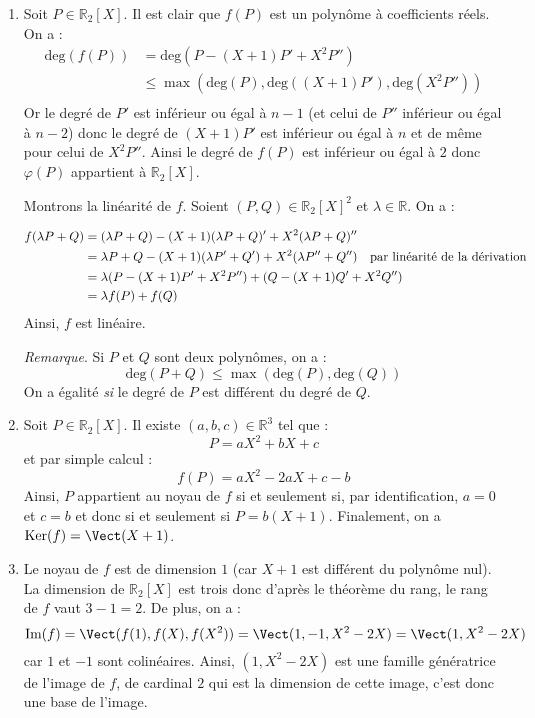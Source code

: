 \documentclass[a4paper,twoside,french,11pt]{VcCours}
\begin{document}
\begin{enumerate}
\item Soit $P \in \mathbb{R}_2[X]$. Il est clair que $f(P)$ est un polynôme à coefficients réels. On a :
\begin{align*}
\textrm{deg}(f(P)) & =  \textrm{deg}(P-(X+1)P'+X^2 P'')  \\
& \leq \max( \textrm{deg}(P) , \textrm{deg}((X+1)P'), \textrm{deg}(X^2P'') ) \\
\end{align*}
Or le degré de $P'$ est inférieur ou égal à $n-1$ (et celui de $P''$ inférieur ou égal à $n-2$) donc le degré de $(X+1)P'$ est inférieur ou égal à $n$ et de même pour celui de $X^2P''$. Ainsi le degré de $f(P)$ est inférieur ou égal à $2$ donc $\varphi(P)$ appartient à $\mathbb{R}_2[X]$.



\noindent Montrons la linéarité de $f$. Soient $(P,Q) \in \mathbb{R}_{2}[X]^2$ et $\lambda \in \mathbb{R}$. On a :

\begin{align*}
f(\lambda P + Q) & = (\lambda P+Q)-(X+1)(\lambda P+Q)'+X^2(\lambda P+Q)'' \\
& = \lambda P+Q - (X+1)(\lambda P' + Q') + X^2 (\lambda P''+Q'') \quad \hbox{par linéarité de la dérivation} \\
& = \lambda (P-(X+1)P'+X^2 P'') + (Q-(X+1)Q'+X^2 Q'') \\
& = \lambda f(P) + f(Q) 
\end{align*}
Ainsi, $f$ est linéaire.



\noindent \textit{Remarque}. Si $P$ et $Q$ sont deux polynômes, on a :
$$ \textrm{deg}(P+Q) \leq \max ( \textrm{deg}(P),  \textrm{deg}(Q))$$
On a égalité \textit{si} le degré de $P$ est différent du degré de $Q$.




\item Soit $P \in \mathbb{R}_2[X]$. Il existe $(a,b,c) \in \mathbb{R}^3$ tel que :
$$ P= aX^2+bX+c$$
et par simple calcul :
$$f(P) = aX^2-2aX+c-b$$
Ainsi, $P$ appartient au noyau de $f$ si et seulement si, par identification, $a=0$ et $c=b$ et donc si et seulement si $P =b(X+1)$. Finalement, on a $\textrm{Ker}(f)= \Vect(X+1)$.
\item Le noyau de $f$ est de dimension $1$ (car $X+1$ est différent du polynôme nul). La dimension de $\mathbb{R}_2[X]$ est trois donc d'après le théorème du rang, le rang de $f$ vaut $3-1=2$. De plus, on a :
$$ \textrm{Im}(f) = \Vect(f(1), f(X), f(X^2)) = \Vect(1,-1, X^2-2X) = \Vect(1,X^2-2X)$$
car $1$ et $-1$ sont colinéaires. Ainsi, $(1,X^2-2X)$ est une famille génératrice de l'image de $f$, de cardinal $2$ qui est la dimension de cette image, c'est donc une base de l'image.
\end{enumerate}
\end{document}
